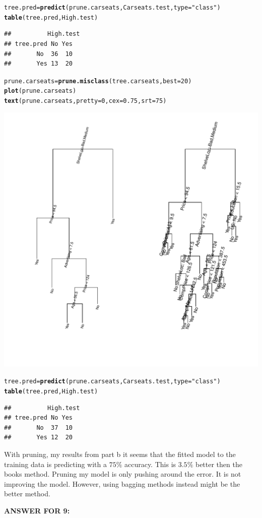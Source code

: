 \documentclass{article}\usepackage[]{graphicx}\usepackage[]{color}
\makeatletter
\def\maxwidth{ %
  \ifdim\Gin@nat@width>\linewidth
    \linewidth
  \else
    \Gin@nat@width
  \fi
}
\newcommand{\hlnum}[1]{\textcolor[rgb]{0.686,0.059,0.569}{#1}}%
\newcommand{\hlstr}[1]{\textcolor[rgb]{0.192,0.494,0.8}{#1}}%
\newcommand{\hlstd}[1]{\textcolor[rgb]{0.345,0.345,0.345}{#1}}%
\newcommand{\hlkwb}[1]{\textcolor[rgb]{0.69,0.353,0.396}{#1}}%
\newcommand{\hlkwc}[1]{\textcolor[rgb]{0.333,0.667,0.333}{#1}}%
\newcommand{\hlkwd}[1]{\textcolor[rgb]{0.737,0.353,0.396}{\textbf{#1}}}%
\newenvironment{kframe}{%
 \def\at@end@of@kframe{}%
 \ifinner\ifhmode%
  \def\at@end@of@kframe{\end{minipage}}%
  \begin{minipage}{\columnwidth}%
 \fi\fi%
 \def\FrameCommand##1{\hskip\@totalleftmargin \hskip-\fboxsep
 \colorbox{shadecolor}{##1}\hskip-\fboxsep
     \hskip-\linewidth \hskip-\@totalleftmargin \hskip\columnwidth}%
 \MakeFramed {\advance\hsize-\width
   \@totalleftmargin\z@ \linewidth\hsize
   \@setminipage}}%
 {\par\unskip\endMakeFramed%
 \at@end@of@kframe}
\newenvironment{knitrout}{}{} %
\makeatother
\begin{document}
\begin{enumerate}[(a)]
\begin{knitrout}
\begin{kframe}
\begin{alltt}
\hlstd{tree.pred}\hlkwb{=}\hlkwd{predict} \hlstd{(prune.carseats , Carseats.test ,}\hlkwc{type}\hlstd{=}\hlstr{"class"}\hlstd{)}
\hlkwd{table}\hlstd{(tree.pred ,High.test)}
\end{alltt}
\begin{verbatim}
##          High.test
## tree.pred No Yes
##       No  36  10
##       Yes 13  20
\end{verbatim}
\begin{alltt}
\hlstd{prune.carseats} \hlkwb{=}\hlkwd{prune.misclass} \hlstd{(tree.carseats ,}\hlkwc{best} \hlstd{=}\hlnum{20}\hlstd{)}
\hlkwd{plot}\hlstd{(prune.carseats )}
\hlkwd{text}\hlstd{(prune.carseats ,}\hlkwc{pretty} \hlstd{=}\hlnum{0}\hlstd{,}\hlkwc{cex}\hlstd{=}\hlnum{0.75}\hlstd{,}\hlkwc{srt}\hlstd{=}\hlnum{75}\hlstd{)}
\end{alltt}
\end{kframe}
\includegraphics[width=\maxwidth]{figure/unnamed-chunk-4-2} 
\begin{kframe}\begin{alltt}
\hlstd{tree.pred}\hlkwb{=}\hlkwd{predict} \hlstd{(prune.carseats , Carseats.test ,}\hlkwc{type}\hlstd{=}\hlstr{"class"}\hlstd{)}
\hlkwd{table}\hlstd{(tree.pred ,High.test)}
\end{alltt}
\begin{verbatim}
##          High.test
## tree.pred No Yes
##       No  37  10
##       Yes 12  20
\end{verbatim}
\end{kframe}
\end{knitrout}
With pruning, my results from part b it seems that the fitted model to the training data is predicting with a $75\%$ accuracy. This is $3.5\%$ better then the books method. Pruning my model is only pushing around the error. It is not improving the model. However, using bagging methods instead might be the better method.
\end{enumerate}
\newpage
\textbf{ANSWER FOR 9:} \\
\end{document}
